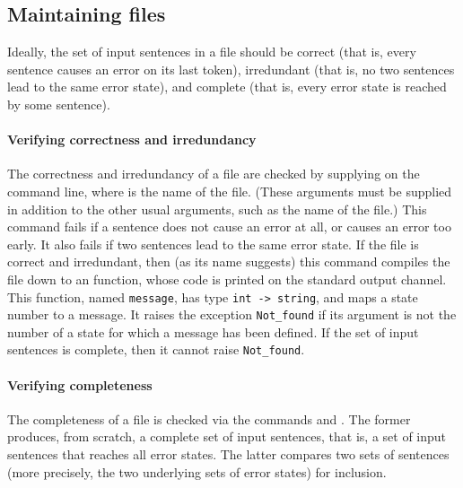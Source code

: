 \documentclass[onecolumn,11pt,nocopyrightspace,preprint]{sigplanconf}
\begin{document}

\subsection{Maintaining \messages files}
\label{sec:messages:tools}

Ideally, the set of input sentences in a \messages file should be correct
(that is, every sentence causes an error on its last token), irredundant (that
is, no two sentences lead to the same error state), and complete (that is,
every error state is reached by some sentence).

\paragraph{Verifying correctness and irredundancy}

The correctness and irredundancy of a \messages file are checked by supplying
\ocompileerrors {} on the command line, where  is the
name of the \messages file. (These arguments must be supplied in addition to
the other usual arguments, such as the name of the \mly file.) This command
fails if a sentence does not cause an error at all, or causes an error too
early. It also fails if two sentences lead to the same error state.
%
If the file is correct and irredundant, then (as its name suggests) this
command compiles the \messages file down to an \ocaml function, whose code
is printed on the standard output channel. This function, named \verb+message+,
has type \verb+int -> string+, and maps a state number to a message. It
raises the exception \verb+Not_found+ if its argument is not the number of
a state for which a message has been defined. If the set of input sentences
is complete, then it cannot raise \verb+Not_found+.

\paragraph{Verifying completeness}

The completeness of a \messages file is checked via the commands \olisterrors
and \ocompareerrors. The former produces, from scratch, a complete set of
input sentences, that is, a set of input sentences that reaches all error
states. The latter compares two sets of sentences (more precisely, the two
underlying sets of error states) for inclusion.
\end{document}
